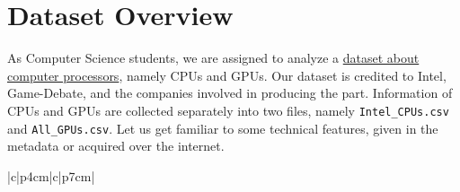 \chapter{Dataset Overview}

As Computer Science students, we are assigned to analyze a \href{https://www.kaggle.com/datasets/iliassekkaf/computerparts/data}{dataset about computer processors}, namely CPUs and GPUs. Our dataset is credited to Intel, Game-Debate, and the companies involved in producing the part. Information of CPUs and GPUs are collected separately into two files, namely \texttt{Intel\_CPUs.csv} and \texttt{All\_GPUs.csv}. Let us get familiar to some technical features, given in the metadata or acquired over the internet.

\begin{center}
  \begin{longtblr}[caption={Some technical features of CPUs and GPUs}]{|c|p{4cm}|c|p{7cm}|}


\end{longtblr}
\end{center}
